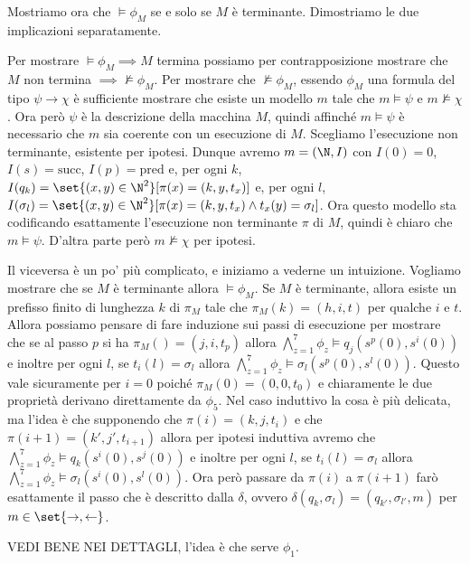 Mostriamo ora che \(\models \phi_M\) se e solo se \(M\) è terminante. Dimostriamo le due implicazioni separatamente.

Per mostrare \(\models \phi_M \implies M\) termina possiamo per contrapposizione mostrare che \(M\) non termina \(\implies \not\models \phi_M\). Per mostrare che \(\not\models \phi_M\), essendo \(\phi_M\) una formula del tipo \(\psi \to \chi\) è sufficiente mostrare che esiste un modello \(m\) tale che \(m \models \psi\) e \(m \not\models \chi\). Ora però \(\psi\) è la descrizione della macchina \(M\), quindi affinché \(m \models \psi\) è necessario che \(m\) sia coerente con un esecuzione di \(M\). Scegliamo l'esecuzione non terminante, esistente per ipotesi. Dunque avremo \(m = (\N, I)\) con \(I(0) = 0\), \(I(s) = \text{succ}\), \(I(p) = \text{pred}\) e, per ogni \(k\), \(I(q_k) = \set{(x,y)\in\N^2}[\pi(x) = (k,y,t_x)]\) e, per ogni \(l\), \(I(\sigma_l) = \set{(x,y)\in\N^2}[\pi(x) = (k,y,t_x) \land t_x(y) = \sigma_l]\). Ora questo modello sta codificando esattamente l'esecuzione non terminante \(\pi\) di \(M\), quindi è chiaro che \(m \models \psi\). D'altra parte però \(m \not\models \chi\) per ipotesi.

Il viceversa è un po' più complicato, e iniziamo a vederne un intuizione. Vogliamo mostrare che se \(M\) è terminante allora \(\models \phi_M\). Se \(M\) è terminante, allora esiste un prefisso finito di lunghezza \(k\) di \(\pi_M\) tale che \(\pi_M(k) = (h,i,t)\) per qualche \(i\) e \(t\). Allora possiamo pensare di fare induzione sui passi di esecuzione per mostrare che se al passo \(p\) si ha \(\pi_M() = (j, i, t_p)\) allora \(\bigwedge_{z = 1}^{7} \phi_{z} \models q_j(s^p(0),s^i(0))\) e inoltre per ogni \(l\), se \(t_i(l) = \sigma_l\) allora \(\bigwedge_{z = 1}^{7} \phi_{z} \models \sigma_l(s^p(0),s^l(0))\). Questo vale sicuramente per \(i = 0\) poiché \(\pi_M(0) = (0,0,t_0)\) e chiaramente le due proprietà derivano direttamente da \(\phi_5\). Nel caso induttivo la cosa è più delicata, ma l'idea è che supponendo che \(\pi(i) = (k, j, t_i)\) e che \(\pi(i+1) = (k', j', t_{i+1})\) allora per ipotesi induttiva avremo che \(\bigwedge_{z = 1}^{7} \phi_{z} \models q_k(s^i(0),s^j(0))\) e inoltre per ogni \(l\), se \(t_i(l) = \sigma_l\) allora \(\bigwedge_{z = 1}^{7} \phi_{z} \models \sigma_l(s^i(0),s^l(0))\). Ora però passare da \(\pi(i)\) a \(\pi(i+1)\) farò esattamente il passo che è descritto dalla \(\delta\), ovvero \(\delta(q_k, \sigma_l) = (q_{k'}, \sigma_{l'}, m)\) per \(m\in\set{\rightarrow, \leftarrow}\).

VEDI BENE NEI DETTAGLI, l'idea è che serve \(\phi_1\).